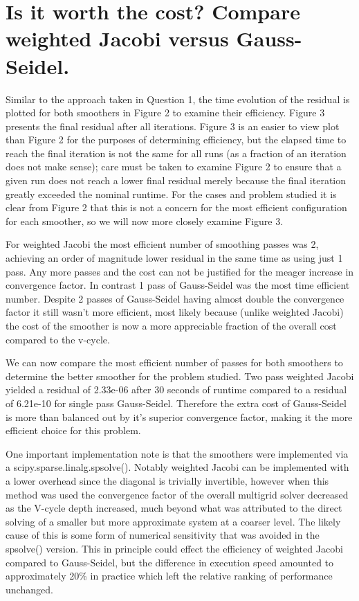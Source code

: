 \documentclass[letterpaper,10pt]{article}
\begin{document}
\section*{ Is it worth the cost? Compare weighted Jacobi versus Gauss-Seidel.}
Similar to the approach taken in Question 1, the time evolution of the residual is plotted for both smoothers in Figure 2 to examine their efficiency. Figure 3 presents the final residual after all iterations. Figure 3 is an easier to view plot than Figure 2 for the purposes of determining efficiency, but the elapsed time to reach the final iteration is not the same for all runs (as a fraction of an iteration does not make sense); care must be taken to examine Figure 2 to ensure that a given run does not reach a lower final residual merely because the final iteration greatly exceeded the nominal runtime. For the cases and problem studied it is clear from Figure 2 that this is not a concern for the most efficient configuration for each smoother, so we will now more closely examine Figure 3.

For weighted Jacobi the most efficient number of smoothing passes was 2, achieving an order of magnitude lower residual in the same time as using just 1 pass. Any more passes and the cost can not be justified for the meager increase in convergence factor. In contrast 1 pass of Gauss-Seidel was the most time efficient number. Despite 2 passes of Gauss-Seidel having almost double the convergence factor it still wasn't more efficient, most likely because (unlike weighted Jacobi) the cost of the smoother is now a more appreciable fraction of the overall cost compared to the v-cycle.

We can now compare the most efficient number of passes for both smoothers to determine the better smoother for the problem studied. Two pass weighted Jacobi yielded a residual of 2.33e-06 after 30 seconds of runtime compared to a residual of 6.21e-10 for single pass Gauss-Seidel. Therefore the extra cost of Gauss-Seidel is more than balanced out by it's superior convergence factor, making it the more efficient choice for this problem.

One important implementation note is that the smoothers were implemented via a scipy.sparse.linalg.spsolve(). Notably weighted Jacobi can be implemented with a lower overhead since the diagonal is trivially invertible, however when this method was used the convergence factor of the overall multigrid solver decreased as the V-cycle depth increased, much beyond what was attributed to the direct solving of a smaller but more approximate system at a coarser level. The likely cause of this is some form of numerical sensitivity that was avoided in the spsolve() version. This in principle could effect the efficiency of weighted Jacobi compared to Gauss-Seidel, but the difference in execution speed amounted to approximately 20\% in practice which left the relative ranking of performance unchanged.
\end{document}
